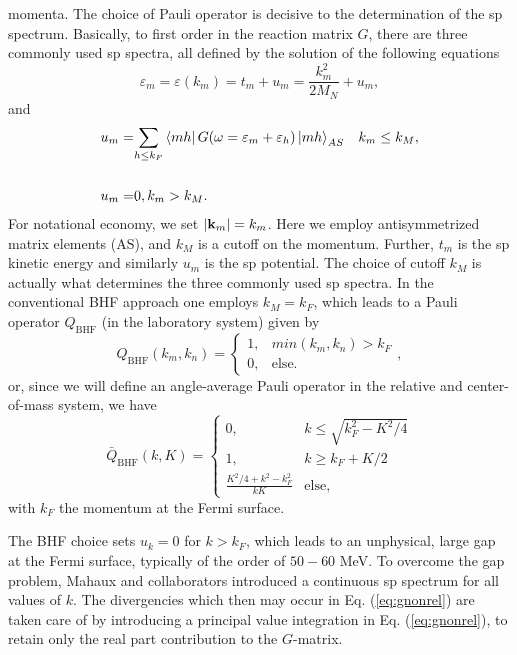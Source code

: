 \documentclass[%
oneside,                 %
final,                   %
10pt]{article}
\begin{document}
momenta.
The choice of Pauli operator is decisive to the determination of the
sp
spectrum. Basically, to first order in the reaction matrix $G$,
there are three commonly used sp spectra, all
defined by the solution of the following equations
\begin{equation}
   \varepsilon_{m} = \varepsilon (k_{m})= t_{m} + u_{m}=\frac{k_{m}^2}{2M_N}+u_{m},
   \label{eq:spnrel}
\end{equation}
and
\begin{align}
   u_{m} =& {\displaystyle \sum_{h \leq k_F}}\left\langle m h \right| G(\omega = \varepsilon_{m} + \varepsilon_h )
   \left| m h \right\rangle_{AS}  \hspace{3mm}k_m \leq k_M,  \\ \\
   u_m=&0, k_m > k_M.
   \label{eq:selfcon}
\end{align}
For notational economy, we set $|{\bf k}_m|=k_m$.
Here we employ antisymmetrized matrix elements (AS), and $k_M$ is a cutoff
on the momentum. Further, $t_m$ is the sp kinetic
energy and similarly $u_m$
is the
sp potential.
The choice of cutoff $k_M$ is actually what determines the three
commonly used sp spectra.
In the conventional BHF approach one employs $k_M = k_F$,
which leads
to a Pauli operator $Q_{\mathrm{BHF}}$ (in the laboratory system) given by
\begin{equation}
   Q_{\mathrm{BHF}}(k_m , k_n ) =
    \left\{\begin{array}{cc}1,&min(k_m ,k_n ) > k_F\\
    0,&\mathrm{else}.\end{array}\right.
    \label{eq:bhf},
\end{equation}
or, since we will define an
angle-average Pauli operator in the relative and center-of-mass
system, we have
\begin{equation}
     \bar{Q}_{\mathrm{BHF}}(k,K)=\left\{\begin{array}{cc}
         0,&k\leq \sqrt{k_{F}^{2}-K^2/4}\\
         1,&k\geq k_F + K/2\\
	\frac{K^2/4+k^2 -k_{F}^2}{kK}&\mathrm{else},\end{array}\right.
    \label{eq:qbhf}
\end{equation}
with $k_F$ the momentum at the Fermi surface.

The BHF choice sets $u_k = 0$ for $k > k_F$, which leads
to an unphysical, large gap at the Fermi surface, typically
of the order of $50-60$ MeV. 
To overcome the gap
problem, Mahaux and collaborators 
introduced a continuous sp spectrum
for all values of $k$. The divergencies
which then may occur in Eq. (\ref{eq:gnonrel}) are taken care of by
introducing
a principal value integration in Eq. (\ref{eq:gnonrel}),
to retain only the
real part contribution to the $G$-matrix.
\end{document}
